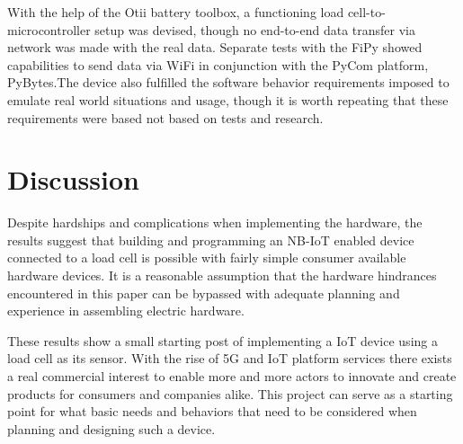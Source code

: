 \iffalse
\begin{itemize}
	\item Don’t make the reader do all the work
	\item Have a hypothesis, test them, state result clearly
	\item Two lists are not a comparison
	\item Be the first to criticize your own work
\end{itemize}
\fi

With the help of the Otii battery toolbox, a functioning load cell-to-microcontroller setup was devised, though no end-to-end data transfer via network was made with the real data. Separate tests with the FiPy showed capabilities to send data via WiFi in conjunction with the PyCom platform, PyBytes.The device also fulfilled the software behavior requirements imposed to emulate real world situations and usage, though it is worth repeating that these requirements were based not based on tests and research.

\section{Discussion}
Despite hardships and complications when implementing the hardware, the results suggest that building and programming an NB-IoT enabled device connected to a load cell is possible with fairly simple consumer available hardware devices. It is a reasonable assumption that the hardware hindrances encountered in this paper can be bypassed with adequate planning and experience in assembling electric hardware.

These results show a small starting post of implementing a IoT device using a load cell as its sensor. With the rise of 5G and IoT platform services there exists a real commercial interest to enable more and more actors to innovate and create products for consumers and companies alike. This project can serve as a starting point for what basic needs and behaviors that need to be considered when planning and designing such a device.	

